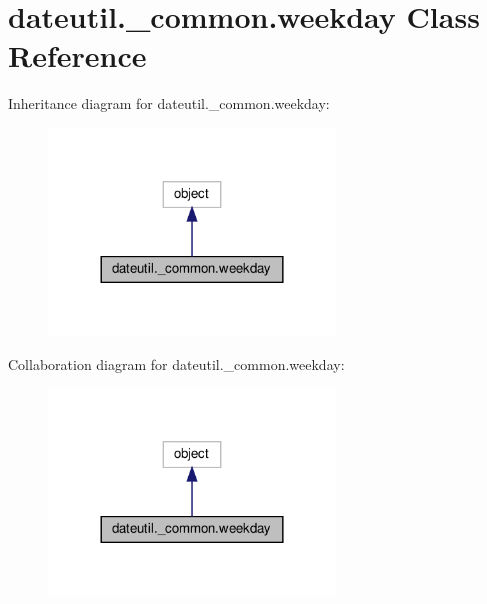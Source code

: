 \hypertarget{classdateutil_1_1__common_1_1weekday}{}\section{dateutil.\+\_\+common.\+weekday Class Reference}
\label{classdateutil_1_1__common_1_1weekday}


Inheritance diagram for dateutil.\+\_\+common.\+weekday\+:
\nopagebreak
\begin{figure}[H]
\begin{center}
\leavevmode
\includegraphics[width=216pt]{classdateutil_1_1__common_1_1weekday__inherit__graph}
\end{center}
\end{figure}


Collaboration diagram for dateutil.\+\_\+common.\+weekday\+:
\nopagebreak
\begin{figure}[H]
\begin{center}
\leavevmode
\includegraphics[width=216pt]{classdateutil_1_1__common_1_1weekday__coll__graph}
\end{center}
\end{figure}
